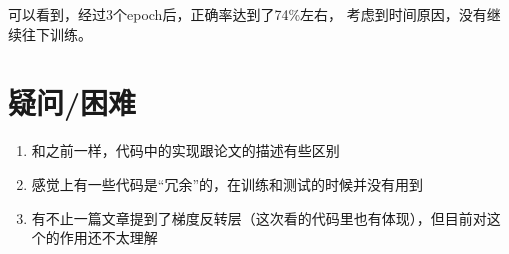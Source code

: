 \documentclass[UTF8]{ctexart}
\begin{document}
            可以看到，经过3个epoch后，正确率达到了74\%左右，
            考虑到时间原因，没有继续往下训练。
    \section{疑问/困难}
        \begin{enumerate}
            \item 和之前一样，代码中的实现跟论文的描述有些区别
            \item 感觉上有一些代码是“冗余”的，在训练和测试的时候并没有用到
            \item 有不止一篇文章提到了梯度反转层（这次看的代码里也有体现），但目前对这个的作用还不太理解
        \end{enumerate}
\end{document}
